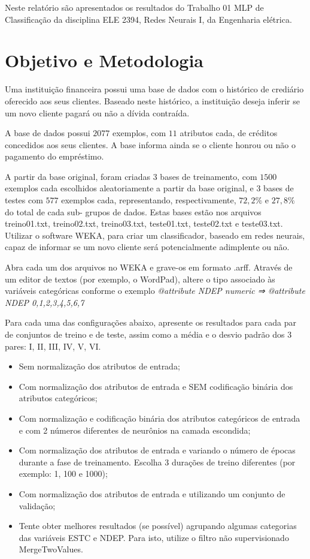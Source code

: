 \documentclass[journal, a4paper]{IEEEtran}
\begin{document}
	Neste relatório são apresentados os resultados do Trabalho 01 MLP de Classificação da disciplina ELE 2394, Redes Neurais I, da Engenharia elétrica.
	

\section{Objetivo e Metodologia}


Uma instituição financeira possui uma base de dados com o histórico de crediário
oferecido aos seus clientes. Baseado neste histórico, a instituição deseja inferir se um
novo cliente pagará ou não a dívida contraída.

A base de dados possui $2077$ exemplos, com $11$ atributos cada, de créditos concedidos
aos seus clientes. A base informa ainda se o cliente honrou ou não o pagamento do
empréstimo. 

A partir da base original, foram criadas 3 bases de treinamento, com $1500$ exemplos
cada escolhidos aleatoriamente a partir da base original, e $3$ bases de testes com $577$
exemplos cada, representando, respectivamente, $72,2\%$ e $27,8\%$ do total de cada sub-
grupos de dados. Estas bases estão nos arquivos treino01.txt, treino02.txt, treino03.txt,
teste01.txt, teste02.txt e teste03.txt. Utilizar o software WEKA, para criar um classificador, baseado em redes neurais, capaz de informar se um novo cliente será potencialmente adimplente ou não. 

Abra cada um dos arquivos no WEKA e grave-os em formato .arff. Através de um
editor de textos (por exemplo, o WordPad), altere o tipo associado às variáveis
categóricas conforme o exemplo \textit{@attribute NDEP numeric ⇒ @attribute NDEP {0,1,2,3,4,5,6,7}}

 Para cada uma das configurações abaixo, apresente os resultados para cada par de conjuntos de treino e de teste, assim como a média e o desvio padrão dos 3 pares: I, II, III, IV, V, VI.
\begin{itemize}
	 \item Sem normalização dos atributos de entrada;
     \item Com normalização dos atributos de entrada e SEM codificação binária dos atributos categóricos;
     \item Com normalização e codificação binária dos atributos categóricos de entrada e com 2 números diferentes de neurônios na camada escondida;
     \item Com normalização dos atributos de entrada e variando o número de épocas durante a fase de treinamento. Escolha 3 durações de treino diferentes (por exemplo: 1, 100 e 1000);
     \item Com normalização dos atributos de entrada e utilizando um conjunto de validação;
     \item Tente obter melhores resultados (se possível) agrupando algumas categorias das variáveis ESTC e NDEP. Para isto, utilize o filtro não supervisionado MergeTwoValues.
\end{itemize}
\end{document}
